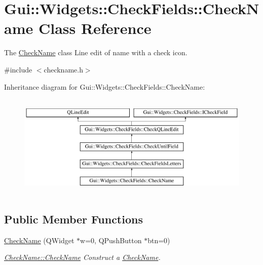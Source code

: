 \hypertarget{classGui_1_1Widgets_1_1CheckFields_1_1CheckName}{\section{Gui\-:\-:Widgets\-:\-:Check\-Fields\-:\-:Check\-Name Class Reference}
\label{classGui_1_1Widgets_1_1CheckFields_1_1CheckName}
}


The \hyperlink{classGui_1_1Widgets_1_1CheckFields_1_1CheckName}{Check\-Name} class Line edit of name with a check icon.  




{\ttfamily \#include $<$checkname.\-h$>$}

Inheritance diagram for Gui\-:\-:Widgets\-:\-:Check\-Fields\-:\-:Check\-Name\-:\begin{figure}[H]
\begin{center}
\leavevmode
\includegraphics[height=5.000000cm]{da/d67/classGui_1_1Widgets_1_1CheckFields_1_1CheckName}
\end{center}
\end{figure}
\subsection*{Public Member Functions}
\begin{DoxyCompactItemize}
\item 
\hyperlink{classGui_1_1Widgets_1_1CheckFields_1_1CheckName_a1a75917c490d7b8e948e76a1c1c5210b}{Check\-Name} (Q\-Widget $\ast$w=0, Q\-Push\-Button $\ast$btn=0)
\begin{DoxyCompactList}\small\item\em \hyperlink{classGui_1_1Widgets_1_1CheckFields_1_1CheckName_a1a75917c490d7b8e948e76a1c1c5210b}{Check\-Name\-::\-Check\-Name} Construct a \hyperlink{classGui_1_1Widgets_1_1CheckFields_1_1CheckName}{Check\-Name}. \end{DoxyCompactList}\end{DoxyCompactItemize}

